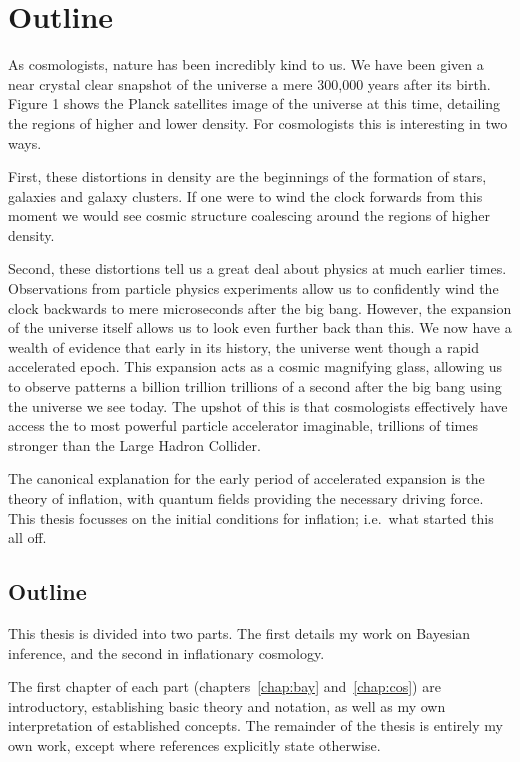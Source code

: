 \chapter{Outline}
\label{chap:out}

As cosmologists, nature has been incredibly kind to us. We have been given a near crystal clear snapshot of the universe a mere 300,000 years after its birth. Figure 1 shows the Planck satellites image of the universe at this time, detailing the regions of higher and lower density. For cosmologists this is interesting in two ways. 

First, these distortions in density are the beginnings of the formation of stars, galaxies and galaxy clusters. If one were to wind the clock forwards from this moment we would see cosmic structure coalescing around the regions of higher density.

Second, these distortions tell us a great deal about physics at much earlier times. Observations from particle physics experiments allow us to confidently wind the clock backwards to mere microseconds after the big bang.
However, the expansion of the universe itself allows us to look even further back than this. We now have a wealth of evidence that early in its history, the universe went though a rapid accelerated epoch.  This expansion acts as a cosmic magnifying glass, allowing us to observe patterns a billion trillion trillions of a second after the big bang using the universe we see today. The upshot of this is that cosmologists effectively have access the to most powerful particle accelerator imaginable, trillions of times stronger than the Large Hadron Collider. 

The canonical explanation for the early period of accelerated expansion is the theory of inflation, with quantum fields providing the necessary driving force. This thesis focusses on the initial conditions for inflation; i.e.\ what started this all off.


\section{Outline}

This thesis is divided into two parts. The first details my work on Bayesian inference, and the second in inflationary cosmology.

The first chapter of each part (chapters~\ref{chap:bay} and~\ref{chap:cos}) are introductory, establishing basic theory and notation, as well as my own interpretation of established concepts. The remainder of the thesis is entirely my own work, except where references explicitly state otherwise.

